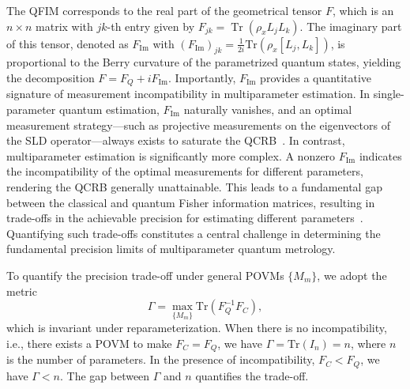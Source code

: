 \documentclass[
aps,
prl,
twocolumn,

superscriptaddress]{revtex4-2}
\begin{document}
The QFIM corresponds to the real part of the geometrical tensor $F$, which is an $n\times n$ matrix with $jk$-th entry given by $F_{jk}=\operatorname{Tr}(\rho_x L_jL_k)$. The imaginary part of this tensor, denoted as $F_{\text{Im}}$ with $(F_{\text{Im}})_{jk}=\frac{1}{2i}\text{Tr}(\rho_x[L_j,L_k])$, is proportional to the Berry curvature of the parametrized quantum states, yielding the decomposition $F=F_Q+iF_{\text{Im}}$. Importantly, $F_{\text{Im}}$ provides a quantitative signature of measurement incompatibility in multiparameter estimation. In single-parameter quantum estimation, $F_{\text{Im}}$ naturally vanishes, and an optimal measurement strategy—such as projective measurements on the eigenvectors of the SLD operator—always exists to saturate the QCRB~\cite{BrauC94,BrauCM96}.  In contrast, multiparameter estimation is significantly more complex. A nonzero $F_{\text{Im}}$ indicates the incompatibility of the optimal measurements for different parameters, rendering the QCRB generally unattainable. This leads to a fundamental gap between the classical and quantum Fisher information matrices, resulting in trade-offs in the achievable precision for estimating different parameters~\cite{arthurs1965,Arthurs1988,Ozawa2003,OZAWA2004367,OZAWA2004350,OZAWA200321,Ozawa_2014,Hall2004,Branciard2013,Branciard2014,2014Error,Lu2014,chen2024simultaneous}.
Quantifying such trade-offs constitutes a central challenge in determining the fundamental precision limits of multiparameter quantum metrology.


To quantify the precision trade-off under general POVMs $\{M_m\}$, we adopt the metric~\cite{MatsumotoThesis,HongzhenPra,HongzhenPRL,GillM00,HayaM05,Zhu2018universally}
\begin{equation}
    \Gamma=\max_{\{M_m\}}\text{Tr}(F_Q^{-1}F_C),
\end{equation}
which is invariant under reparameterization. When there is no incompatibility, i.e., there exists a POVM to make $F_C=F_Q$, we have $\Gamma=\text{Tr}(I_n)=n$, where $n$ is the number of parameters. In the presence of incompatibility,  $F_C<F_Q$, we have $\Gamma<n$. The gap between $\Gamma$ and $n$ quantifies the trade-off.
\end{document}
